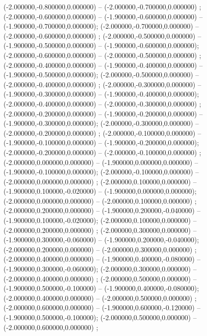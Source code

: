  (-2.000000,-0.800000,0.000000) -- (-2.000000,-0.700000,0.000000) ;
 (-2.000000,-0.600000,0.000000) -- (-1.900000,-0.600000,0.000000) -- (-1.900000,-0.700000,0.000000);
 (-2.000000,-0.700000,0.000000) -- (-2.000000,-0.600000,0.000000) ;
 (-2.000000,-0.500000,0.000000) -- (-1.900000,-0.500000,0.000000) -- (-1.900000,-0.600000,0.000000);
 (-2.000000,-0.600000,0.000000) -- (-2.000000,-0.500000,0.000000) ;
 (-2.000000,-0.400000,0.000000) -- (-1.900000,-0.400000,0.000000) -- (-1.900000,-0.500000,0.000000);
 (-2.000000,-0.500000,0.000000) -- (-2.000000,-0.400000,0.000000) ;
 (-2.000000,-0.300000,0.000000) -- (-1.900000,-0.300000,0.000000) -- (-1.900000,-0.400000,0.000000);
 (-2.000000,-0.400000,0.000000) -- (-2.000000,-0.300000,0.000000) ;
 (-2.000000,-0.200000,0.000000) -- (-1.900000,-0.200000,0.000000) -- (-1.900000,-0.300000,0.000000);
 (-2.000000,-0.300000,0.000000) -- (-2.000000,-0.200000,0.000000) ;
 (-2.000000,-0.100000,0.000000) -- (-1.900000,-0.100000,0.000000) -- (-1.900000,-0.200000,0.000000);
 (-2.000000,-0.200000,0.000000) -- (-2.000000,-0.100000,0.000000) ;
 (-2.000000,0.000000,0.000000) -- (-1.900000,0.000000,0.000000) -- (-1.900000,-0.100000,0.000000);
 (-2.000000,-0.100000,0.000000) -- (-2.000000,0.000000,0.000000) ;
 (-2.000000,0.100000,0.000000) -- (-1.900000,0.100000,-0.020000) -- (-1.900000,0.000000,0.000000);
 (-2.000000,0.000000,0.000000) -- (-2.000000,0.100000,0.000000) ;
 (-2.000000,0.200000,0.000000) -- (-1.900000,0.200000,-0.040000) -- (-1.900000,0.100000,-0.020000);
 (-2.000000,0.100000,0.000000) -- (-2.000000,0.200000,0.000000) ;
 (-2.000000,0.300000,0.000000) -- (-1.900000,0.300000,-0.060000) -- (-1.900000,0.200000,-0.040000);
 (-2.000000,0.200000,0.000000) -- (-2.000000,0.300000,0.000000) ;
 (-2.000000,0.400000,0.000000) -- (-1.900000,0.400000,-0.080000) -- (-1.900000,0.300000,-0.060000);
 (-2.000000,0.300000,0.000000) -- (-2.000000,0.400000,0.000000) ;
 (-2.000000,0.500000,0.000000) -- (-1.900000,0.500000,-0.100000) -- (-1.900000,0.400000,-0.080000);
 (-2.000000,0.400000,0.000000) -- (-2.000000,0.500000,0.000000) ;
 (-2.000000,0.600000,0.000000) -- (-1.900000,0.600000,-0.120000) -- (-1.900000,0.500000,-0.100000);
 (-2.000000,0.500000,0.000000) -- (-2.000000,0.600000,0.000000) ;
